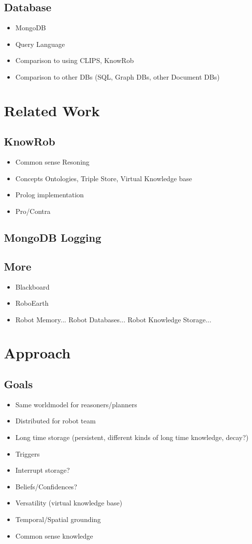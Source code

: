 \documentclass[a4paper,11pt]{article}
\begin{document}
\subsection{Database}
\begin{itemize}
\item MongoDB
\item Query Language
\item Comparison to using CLIPS, KnowRob
\item Comparison to other DBs (SQL, Graph DBs, other Document DBs)
\end{itemize}

\section{Related Work}
\subsection{KnowRob}
\begin{itemize}
\item Common sense Resoning
\item Concepts Ontologies, Triple Store, Virtual Knowledge base
\item Prolog implementation
\item Pro/Contra
\end{itemize}
\subsection{MongoDB Logging}
\subsection{More}
\begin{itemize}
\item Blackboard
\item RoboEarth
\item Robot Memory... Robot Databases... Robot Knowledge Storage...
\end{itemize}


\section{Approach}
\subsection{Goals}
\begin{itemize}
\item Same worldmodel for reasoners/planners
\item Distributed for robot team
\item Long time storage (persistent, different kinds of long time knowledge, decay?)
\item Triggers
\item Interrupt storage?
\item Beliefs/Confidences?
\item Versatility (virtual knowledge base)
\item Temporal/Spatial grounding
\item Common sense knowledge
\end{itemize}
\end{document}
